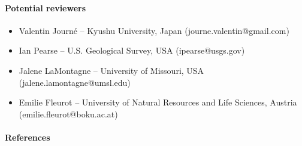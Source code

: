\documentclass[11pt,a4paper]{article}
\begin{document}
\clearpage

\paragraph{Potential reviewers}

\begin{itemize}
  \item Valentin Journé -- Kyushu University, Japan (journe.valentin@gmail.com)
  \item Ian Pearse -- U.S. Geological Survey, USA (ipearse@usgs.gov)
  \item Jalene LaMontagne -- University of Missouri, USA (jalene.lamontagne@umsl.edu)
  \item Emilie Fleurot -- University of Natural Resources and Life Sciences, Austria (emilie.fleurot@boku.ac.at)
\end{itemize}

\paragraph{References}
\printbibliography[heading=none]


\newpage
\end{document}
